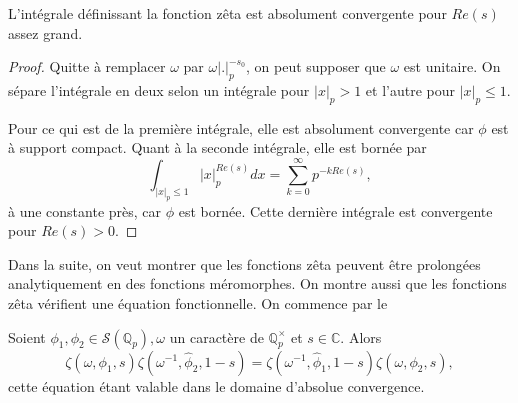 \begin{lemme}
L'intégrale définissant la fonction zêta est absolument convergente pour $Re(s)$ assez grand.
\end{lemme}

\begin{proof}
Quitte à remplacer $\omega$ par $\omega|.|_p^{-s_0}$, on peut supposer que $\omega$ est unitaire. On sépare l'intégrale en deux selon un intégrale pour $|x|_p > 1$ et l'autre pour $|x|_p \leq 1$. 

Pour ce qui est de la première intégrale, elle est absolument convergente car $\phi$ est à support compact. Quant à la seconde intégrale, elle est bornée par
\begin{equation}
\int_{|x|_p \leq 1} |x|_p^{Re(s)}dx=\sum_{k=0}^{\infty} p^{-kRe(s)},
\end{equation}
à une constante près, car $\phi$ est bornée. Cette dernière intégrale est convergente pour $Re(s) > 0$.
\end{proof}

Dans la suite, on veut montrer que les fonctions zêta peuvent être prolongées analytiquement en des fonctions méromorphes. On montre aussi que les fonctions zêta vérifient une équation fonctionnelle. On commence par le
\begin{lemme}
\label{lemme_fun}
Soient $\phi_1, \phi_2 \in \mathcal{S}(\mathbb{Q}_p), \omega$ un caractère de $\mathbb{Q}_p^\times$ et $s \in \mathbb{C}$. Alors
\begin{equation}
\zeta(\omega, \phi_1, s)\zeta(\omega^{-1}, \hat{\phi}_2, 1-s)=\zeta(\omega^{-1}, \hat{\phi}_1, 1-s)\zeta(\omega, \phi_2, s),
\end{equation}
cette équation étant valable dans le domaine d'absolue convergence.
\end{lemme}

